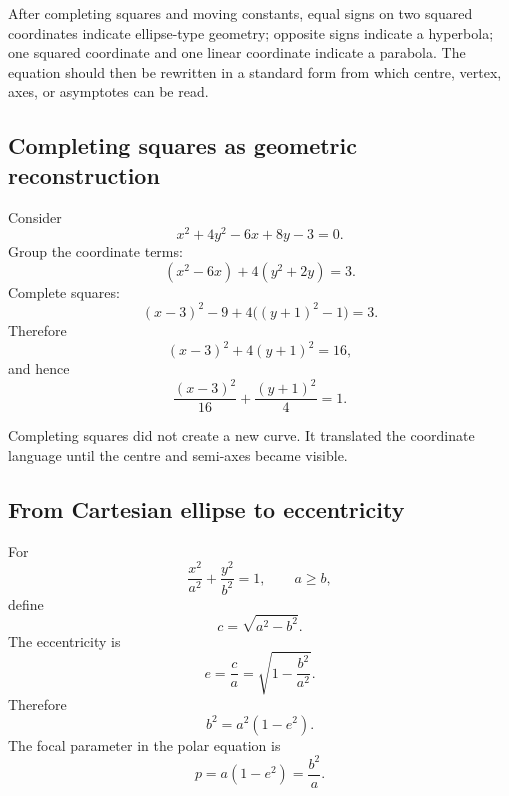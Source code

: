 \begin{corebox}
After completing squares and moving constants, equal signs on two squared
coordinates indicate ellipse-type geometry; opposite signs indicate a
hyperbola; one squared coordinate and one linear coordinate indicate a
parabola. The equation should then be rewritten in a standard form from which
centre, vertex, axes, or asymptotes can be read.
\end{corebox}

\subsection{Completing squares as geometric reconstruction}

Consider
\[
x^2+4y^2-6x+8y-3=0.
\]
Group the coordinate terms:
\[
(x^2-6x)+4(y^2+2y)=3.
\]
Complete squares:
\[
(x-3)^2-9+4\bigl((y+1)^2-1\bigr)=3.
\]
Therefore
\[
(x-3)^2+4(y+1)^2=16,
\]
and hence
\[
\boxed{\frac{(x-3)^2}{16}+\frac{(y+1)^2}{4}=1}.
\]

\begin{center}
\end{center}

\begin{interpretationbox}
Completing squares did not create a new curve. It translated the coordinate
language until the centre and semi-axes became visible.
\end{interpretationbox}

\subsection{From Cartesian ellipse to eccentricity}

For
\[
\frac{x^2}{a^2}+\frac{y^2}{b^2}=1,
\qquad a\geq b,
\]
define
\[
c=\sqrt{a^2-b^2}.
\]
The eccentricity is
\[
\boxed{e=\frac ca=\sqrt{1-\frac{b^2}{a^2}}}.
\]
Therefore
\[
\boxed{b^2=a^2(1-e^2)}.
\]
The focal parameter in the polar equation is
\[
\boxed{p=a(1-e^2)=\frac{b^2}{a}}.
\]

